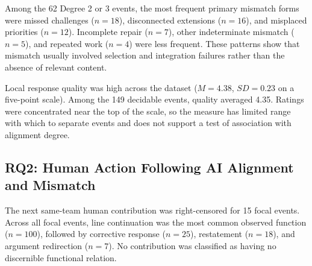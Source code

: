 \documentclass[manuscript,review,anonymous]{acmart}
\begin{document}
Among the 62 Degree 2 or 3 events, the most frequent primary mismatch forms were missed challenges ($n=18$), disconnected extensions ($n=16$), and misplaced priorities ($n=12$). Incomplete repair ($n=7$), other indeterminate mismatch ($n=5$), and repeated work ($n=4$) were less frequent. These patterns show that mismatch usually involved selection and integration failures rather than the absence of relevant content.

Local response quality was high across the dataset ($M=4.38$, $SD=0.23$ on a five-point scale). Among the 149 decidable events, quality averaged 4.35. Ratings were concentrated near the top of the scale, so the measure has limited range with which to separate events and does not support a test of association with alignment degree.

\subsection{RQ2: Human Action Following AI Alignment and Mismatch}

The next same-team human contribution was right-censored for 15 focal events. Across all focal events, line continuation was the most common observed function ($n=100$), followed by corrective response ($n=25$), restatement ($n=18$), and argument redirection ($n=7$). No contribution was classified as having no discernible functional relation.
\end{document}

